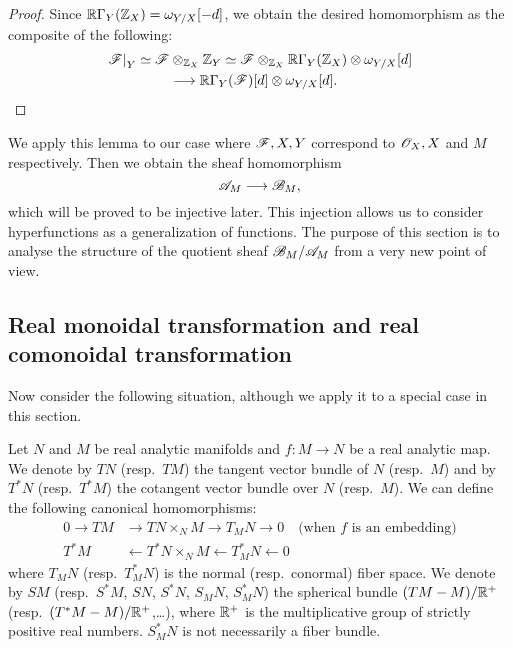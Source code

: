 \begin{proof}
    Since $\mathbb{R}\Gamma_Y(\mathbb{Z}_X) = \omega_{Y/X}[-d]$, we obtain the desired homomorphism
    as the composite of the following:
    \begin{align*}
        \left. \mathscr{F} \right|_{Y} 
        \simeq \mathscr{F}&\otimes_{\mathbb{Z}_X} \mathbb{Z}_Y 
        \simeq \mathscr{F}\otimes_{\mathbb{Z}_X} \mathbb{R}\Gamma_Y(\mathbb{Z}_X)\otimes\omega_{Y/X}[d]\\
        &\longrightarrow \mathbb{R}\Gamma_Y(\mathscr{F})[d]\otimes\omega_{Y/X}[d].
    \end{align*}
\end{proof}

We apply this lemma to our case where $\mathscr{F},X,Y$ correspond to
$\mathscr{O}_{X},X$ and $M$ respectively. Then we obtain the sheaf homomorphism
\begin{equation}
    \mathscr{A}_{M}\longrightarrow \mathscr{B}_{M},
\end{equation}
which will be proved to be injective later. 
This injection allows us to consider hyperfunctions 
as a generalization of functions.
The purpose of this section is 
to analyse the structure of the quotient sheaf 
$\mathscr{B}_{M}/\mathscr{A}_{M}$ from a very new point of view.


\subsection{Real monoidal transformation and real comonoidal transformation}


Now consider the following situation, although we apply it 
to a special case in this section. 

Let $N$ and $M$ be real analytic manifolds 
and $f\colon M \to N$ be a real analytic map. 
We denote by $TN$ (resp.\ $TM$) the tangent vector bundle 
of $N$ (resp.\ $M$) and by $T^\ast N$ (resp.\ $T^\ast M$) the
cotangent vector bundle over $N$ (resp.\ $M$). 
We can define the following canonical homomorphisms: 
\begin{equation}
    \begin{aligned}
        0\to TM &\to TN\times_{N} M \to T_{M} N \to 0 \quad\text{(when $f$ is an embedding)}\\
        T^\ast M &\leftarrow T^\ast N\times_{N} M \leftarrow T_{M}^\ast N \leftarrow 0
    \end{aligned}    
\end{equation}%
where $T_{M} N$ (resp.\ $T_{M}^\ast N$) is 
the normal (resp.\ conormal) fiber space.
We denote by $SM$ (resp.\ $S^\ast M$, $SN$, $S^\ast N$, 
$S_{M} N$, $S_{M}^\ast N$) the spherical 
bundle $(TM - M)/ \mathbb{R}^+$ (resp.\ $(T^\ast M - M)/ \mathbb{R}^+$,\ldots), where $\mathbb{R}^+$ is the 
multiplicative group of strictly positive real numbers. 
$S^\ast_{M}N$ is not necessarily a fiber bundle. 

